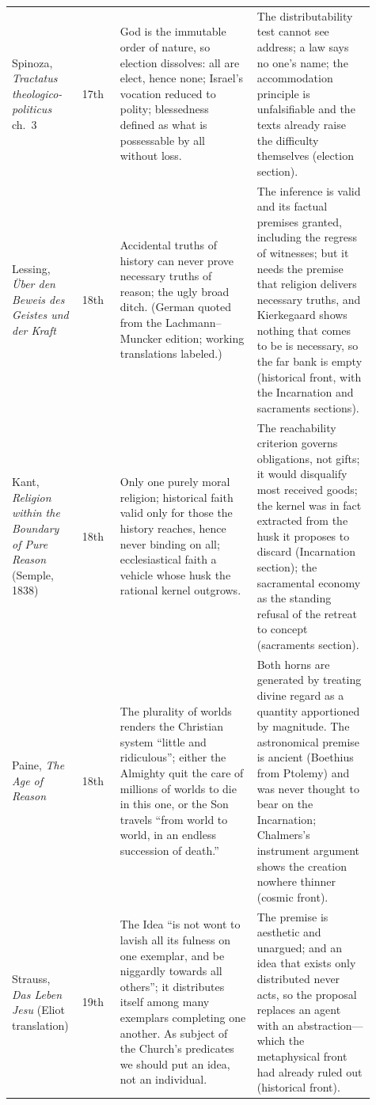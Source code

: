 \begin{longtable}{>{\raggedright\arraybackslash}p{0.14\linewidth}>{\raggedright\arraybackslash}p{0.10\linewidth}>{\raggedright\arraybackslash}p{0.36\linewidth}>{\raggedright\arraybackslash}p{0.31\linewidth}}
Spinoza, \emph{Tractatus theologico-politicus} ch.~3 & 17th & God is the immutable order of nature, so election dissolves: all are elect, hence none; Israel's vocation reduced to polity; blessedness defined as what is possessable by all without loss. & The distributability test cannot see address; a law says no one's name; the accommodation principle is unfalsifiable and the texts already raise the difficulty themselves (election section).\\
Lessing, \emph{\"Uber den Beweis des Geistes und der Kraft} & 18th & Accidental truths of history can never prove necessary truths of reason; the ugly broad ditch. (German quoted from the Lachmann--Muncker edition; working translations labeled.) & The inference is valid and its factual premises granted, including the regress of witnesses; but it needs the premise that religion delivers necessary truths, and Kierkegaard shows nothing that comes to be is necessary, so the far bank is empty (historical front, with the Incarnation and sacraments sections).\\
Kant, \emph{Religion within the Boundary of Pure Reason} (Semple, 1838) & 18th & Only one purely moral religion; historical faith valid only for those the history reaches, hence never binding on all; ecclesiastical faith a vehicle whose husk the rational kernel outgrows. & The reachability criterion governs obligations, not gifts; it would disqualify most received goods; the kernel was in fact extracted from the husk it proposes to discard (Incarnation section); the sacramental economy as the standing refusal of the retreat to concept (sacraments section).\\
Paine, \emph{The Age of Reason} & 18th & The plurality of worlds renders the Christian system ``little and ridiculous''; either the Almighty quit the care of millions of worlds to die in this one, or the Son travels ``from world to world, in an endless succession of death.'' & Both horns are generated by treating divine regard as a quantity apportioned by magnitude. The astronomical premise is ancient (Boethius from Ptolemy) and was never thought to bear on the Incarnation; Chalmers's instrument argument shows the creation nowhere thinner (cosmic front).\\
Strauss, \emph{Das Leben Jesu} (Eliot translation) & 19th & The Idea ``is not wont to lavish all its fulness on one exemplar, and be niggardly towards all others''; it distributes itself among many exemplars completing one another. As subject of the Church's predicates we should put an idea, not an individual. & The premise is aesthetic and unargued; and an idea that exists only distributed never acts, so the proposal replaces an agent with an abstraction---which the metaphysical front had already ruled out (historical front).\\

\end{longtable}
